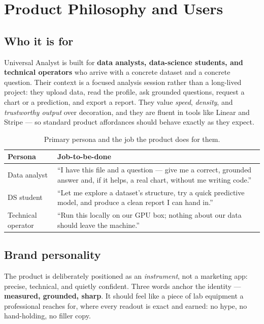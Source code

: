 \chapter{Product Philosophy and Users}
\label{ch:product}

\section{Who it is for}
Universal Analyst is built for \textbf{data analysts, data-science students, and
technical operators} who arrive with a concrete dataset and a concrete question.
Their context is a focused analysis session rather than a long-lived project:
they upload data, read the profile, ask grounded questions, request a chart or a
prediction, and export a report. They value \emph{speed}, \emph{density}, and
\emph{trustworthy output} over decoration, and they are fluent in tools like
Linear and Stripe --- so standard product affordances should behave exactly as
they expect.

\begin{table}[h]
\centering
\caption{Primary persona and the job the product does for them.}
\begin{tabularx}{\linewidth}{@{}L{3.4cm} X@{}}
\toprule
\textbf{Persona} & \textbf{Job-to-be-done} \\
\midrule
Data analyst & ``I have this file and a question --- give me a correct,
grounded answer and, if it helps, a real chart, without me writing code.'' \\
DS student & ``Let me explore a dataset's structure, try a quick predictive
model, and produce a clean report I can hand in.'' \\
Technical operator & ``Run this locally on our GPU box; nothing about our data
should leave the machine.'' \\
\bottomrule
\end{tabularx}
\end{table}

\section{Brand personality}
The product is deliberately positioned as an \emph{instrument}, not a marketing
app: precise, technical, and quietly confident. Three words anchor the identity
--- \textbf{measured, grounded, sharp}. It should feel like a piece of lab
equipment a professional reaches for, where every readout is exact and earned:
no hype, no hand-holding, no filler copy.

